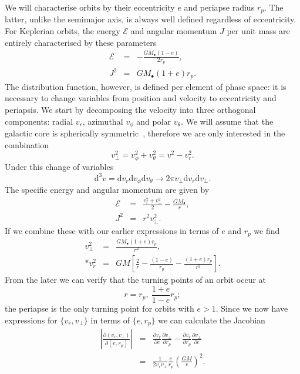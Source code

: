 \documentclass[useAMS,usedcolumn,usegraphicx,usenatbib]{mn2e}
\newcommand{\dd}{\ensuremath{\mathrm{d}}}
\newcommand{\partialdiff}[2]{\ensuremath{\frac{\partial {#1}}{\partial {#2}}}}
\newcommand{\recip}[1]{\ensuremath{\frac{1}{#1}}}
\begin{document}
We will characterise orbits by their eccentricity $e$ and periapse radius $r_p$. The latter, unlike the semimajor axis, is always well defined regardless of eccentricity. For Keplerian orbits, the energy $\mathcal{E}$ and angular momentum $J$ per unit mass are entirely characterised by these parameters
\begin{eqnarray}
\mathcal{E} &=& -\frac{GM_\bullet(1 - e)}{2r_p},\\
J^2 &=& GM_\bullet(1 + e)r_p.
\end{eqnarray}
The distribution function, however, is defined per element of phase space: it is necessary to change variables from position and velocity to eccentricity and periapsis. We start by decomposing the velocity into three orthogonal components: radial $v_r$, azimuthal $v_\phi$ and polar $v_\theta$. We will assume that the galactic core is spherically symmetric~\citep{Genzel2003, Schodel2007}, therefore we are only interested in the combination
\begin{equation}
v_\perp^2 = v_\phi^2 + v_\theta^2 = v^2 - v_r^2.
\end{equation}
Under this change of variables
\begin{equation}
\dd^3v = \dd v_r \dd v_\phi \dd v_\theta \rightarrow 2\pi v_\perp \dd v_r \dd v_\perp.
\end{equation}
The specific energy and angular momentum are given by
\begin{eqnarray}
\mathcal{E} &=& \frac{v_r^2 + v_\perp^2}{2} - \frac{GM_\bullet}{r},\\
J^2 &=& r^2 v_\perp^2.
\end{eqnarray}
If we combine these with our earlier expressions in terms of $e$ and $r_p$ we find
\begin{eqnarray}
v_\perp^2 &=& \frac{GM_\bullet(1 + e)r_p}{r^2}, \nonumber \\*
v_r^2 &=& GM\left[\frac{2}{r} - \frac{(1 - e)}{r_p} - \frac{(1 + e)r_p}{r^2}\right].
\end{eqnarray}
From the later we can verify that the turning points of an orbit occur at
\begin{equation}
r = r_p, \: \frac{1+e}{1-e}r_p;
\end{equation}
the periapse is the only turning point for orbits with $e > 1$. Since we now have expressions for $\{v_r, v_\perp\}$ in terms of $\{e, r_p\}$ we can calculate the Jacobian
\begin{eqnarray}
\left|\frac{\partial(v_r, v_\perp)}{\partial(e, r_p)}\right| &=& \partialdiff{v_r}{e}\partialdiff{v_\perp}{r_p} - \partialdiff{v_r}{r_p}\partialdiff{v_\perp}{e} \\
 &=& \recip{2v_rv_\perp}\frac{e}{r_p}\left(\frac{GM}{r}\right)^2.
\end{eqnarray}
\end{document}
